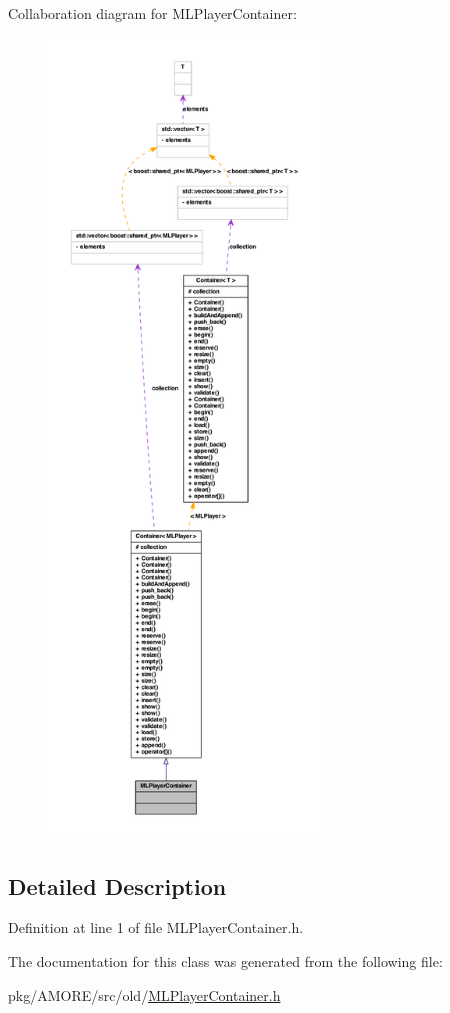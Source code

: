 Collaboration diagram for MLPlayerContainer:
\nopagebreak
\begin{figure}[H]
\begin{center}
\leavevmode
\includegraphics[height=600pt]{class_m_l_player_container__coll__graph}
\end{center}
\end{figure}


\subsection{Detailed Description}


Definition at line 1 of file MLPlayerContainer.h.



The documentation for this class was generated from the following file:\begin{DoxyCompactItemize}
\item 
pkg/AMORE/src/old/\hyperlink{_m_l_player_container_8h}{MLPlayerContainer.h}\end{DoxyCompactItemize}
